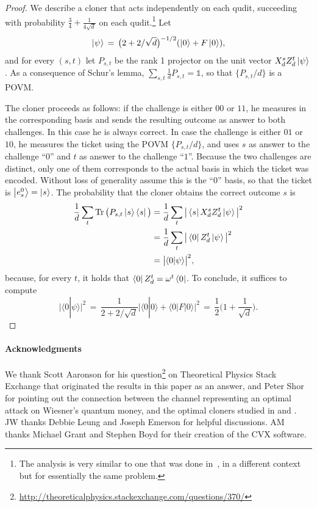\documentclass[11pt,letterpaper]{article}
\theoremstyle{definition}
\newcommand{\microspace}{\mspace{0.5mu}}
\newcommand{\tr}{\operatorname{Tr}}
\def\I{\mathbb{1}}
\def \lket {\left|}
\def \rket {\right\rangle}
\def \lbra {\left\langle}
\def \rbra {\right|}
\newcommand{\ket}[1]{\lket\microspace #1 \microspace\rket}
\newcommand{\bra}[1]{\lbra\microspace #1 \microspace\rbra}
\begin{document}
\begin{proof}
We describe a cloner that acts independently on each qudit, succeeding
with probability $\frac{3}{4}+\frac{1}{4\sqrt{d}}$ on each 
qudit.\footnote{%
  The analysis is very similar to one that was done in~\cite{VW11}, in
  a different context but for essentially the same problem.}
Let 
$$\ket{\psi} \,=\, \big(2+2/\sqrt{d}\big)^{-1/2}(\ket{0}+F\ket{0}),$$
and for every $(s,t)$ let $P_{s,t}$ be the rank 1 projector on the
unit vector $X_d^s Z_d^t\ket{\psi}$. 
As a consequence of Schur's lemma, 
$\sum_{s,t} \frac{1}{d}P_{s,t} = \I$, so that $\big\{P_{s,t}/d\big\}$
is a POVM.

The cloner proceeds as follows: if the challenge is either $00$ or
$11$, he measures in the corresponding basis and sends the resulting
outcome as answer to both challenges. In this case he is always
correct. In case the challenge is either $01$ or $10$, he measures the
ticket using the POVM $\{P_{s,t}/d\}$, and uses $s$ as answer to the
challenge ``$0$'' and $t$ as answer to the challenge ``$1$''. 
Because the two challenges are distinct, only one of them corresponds
to the actual basis in which the ticket was encoded. 
Without loss of generality assume this is the ``$0$'' basis, so that
the ticket is $\ket{e_{s}^0} = \ket{s}$.
The probability that the cloner obtains the correct outcome $s$ is
\begin{align*}
 \frac{1}{d}\sum_t \tr\big(P_{s,t} \ket{s}\bra{s} \big) 
 & = \frac{1}{d}\sum_t \big|\bra{s} X_d^s Z_d^t\ket{\psi}\big|^2\\
 & = \frac{1}{d}\sum_t \big|\bra{0} Z_d^t\ket{\psi}\big|^2\\
 & = \big|\langle 0 | \psi\rangle\big|^2,
\end{align*}
because, for every $t$, it holds that $\bra{0}Z_d^t =\omega^t\bra{0}$. 
To conclude, it suffices to compute
\[
\big|
\langle 0 | \psi \rangle \big|^2 
\,=\, \frac{1}{2+2/\sqrt{d}}\big|
\langle 0 | 0\rangle + \langle 0 | F | 0 \rangle
\big|^2\,=\,\frac{1}{2}\Big(1+\frac{1}{\sqrt{d}}\Big).
\]
\end{proof}

\paragraph{Acknowledgments}

We thank Scott Aaronson for his question\footnote{%
  \url{http://theoreticalphysics.stackexchange.com/questions/370/}} 
on Theoretical Physics Stack Exchange that originated the results in
this paper as an answer, and Peter Shor for pointing out
the connection between the channel representing an optimal
attack on Wiesner's quantum money, and the optimal cloners studied in
\cite{BruCDM00} and \cite{BuzekH96}. 
JW thanks Debbie Leung and Joseph Emerson for helpful discussions.
AM thanks Michael Grant and Stephen Boyd for their creation of the CVX software.


\end{document}
